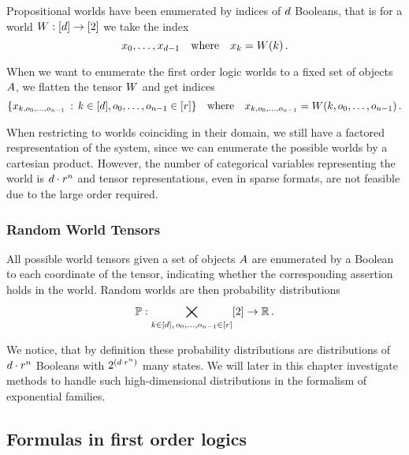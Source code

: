 Propositional worlds have been enumerated by indices of $d$ Booleans, that is for a world $W: [d] \rightarrow [2]$ we take the index
	\[ {x_{0},\ldots,x_{d-1}} \quad \text{where} \quad x_{k} = W(k) \, .  \]

When we want to enumerate the first order logic worlds to a fixed set of objects $A$, we flatten the tensor $W$ and get indices 
	\[ \{x_{k,o_{0},\ldots,o_{n-1}} \, : \, k\in[d], o_{0},\ldots,o_{n-1} \in[r] \} \quad 
	\text{where} \quad x_{k,o_{0},\ldots,o_{n-1}} = W(k,o_{0},\ldots,o_{n-1}) \, .  \]


When restricting to worlds coinciding in their domain, we still have a factored respresentation of the system, since we can enumerate the possible worlds by a cartesian product.
However, the number of categorical variables representing the world is $d\cdot r^{n}$ and tensor representations, even in sparse formats, are not feasible due to the large order required.


\subsubsection{Random World Tensors}



All possible world tensors given a set of objects $A$ are enumerated by a Boolean to each coordinate of the tensor, indicating whether the corresponding assertion holds in the world.
Random worlds are then probability distributions
\begin{align*}
	\mathbb{P} : \bigtimes_{k\in[d], \, o_{0},\ldots,o_{n-1} \in[r]} [2] \rightarrow \mathbb{R} \, . 
\end{align*}

We notice, that by definition these probability distributions are distributions of $d\cdot r^{n}$ Booleans with $2^{\left(d\cdot r^{n}\right)}$ many states.
We will later in this chapter investigate methods to handle such high-dimensional distributions in the formalism of exponential families.




\subsection{Formulas in first order logics}


